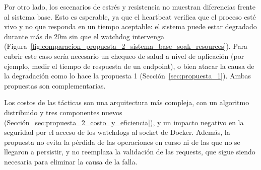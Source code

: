     Por otro lado, los escenarios de estrés y resistencia no muestran diferencias frente al sistema base. Esto es esperable, ya
    que el heartbeat verifica que el proceso esté vivo y no que responda en un tiempo aceptable: el sistema puede estar degradado
    durante más de 20m sin que el watchdog intervenga (Figura~\ref{fig:comparacion_propuesta_2_sistema_base_soak_resources}). Para cubrir este caso sería necesario un chequeo de salud a nivel
    de aplicación (por ejemplo, medir el tiempo de respuesta de un endpoint), o bien atacar la causa de la degradación como lo
    hace la propuesta 1 (Sección~\ref{sec:propuesta_1}). Ambas propuestas son complementarias.

    Los costos de las tácticas son una arquitectura más compleja, con un algoritmo distribuido y tres componentes nuevos
    (Sección~\ref{sec:propuesta_2_costo_y_eficiencia}), y un impacto negativo en la seguridad por el acceso de los watchdogs
    al socket de Docker. Además, la propuesta no evita la
    pérdida de las operaciones en curso ni de las que no se llegaron a persistir, y no reemplaza la validación de las requests,
    que sigue siendo necesaria para eliminar la causa de la falla.
